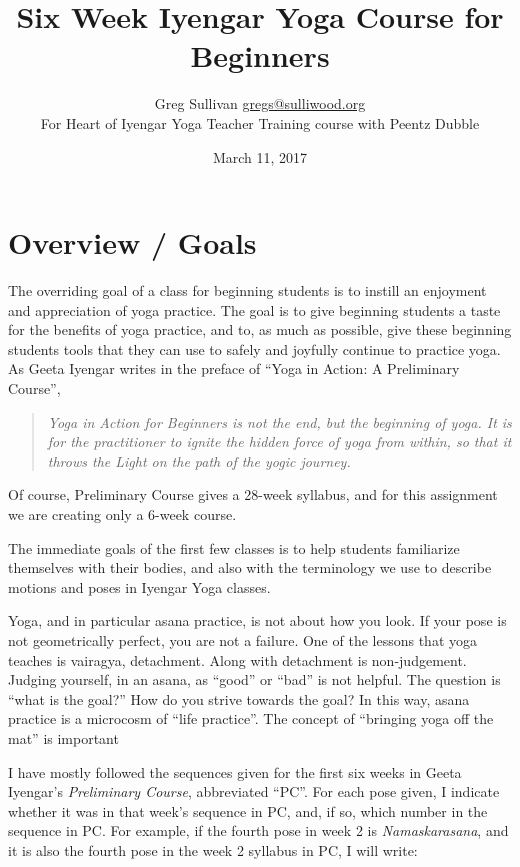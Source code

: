 \documentclass{book}
\title{Six Week Iyengar Yoga Course for Beginners}
\author{Greg Sullivan \href{mailto:gregs@sulliwood.org}{gregs@sulliwood.org} \\
For Heart of Iyengar Yoga Teacher Training course with Peentz Dubble
}
\date{March 11, 2017}
\newcommand{\pose}[1]{\emph{#1}}
\newcommand{\nam}{\pose{Namaskarasana}}
\newcounter{week}
\begin{document}
\maketitle

\tableofcontents

\chapter*{Overview / Goals}
\label{chap:overview}


The overriding goal of a class for beginning students is to instill an
enjoyment and appreciation of yoga practice. The goal is to give
beginning students a taste for the benefits of yoga practice, and to,
as much as possible, give these beginning students tools that they can
use to safely and joyfully continue to practice yoga. As Geeta Iyengar
writes in the preface of ``Yoga in Action: A Preliminary
Course''\cite{GeetaPC}, 

\begin{quote}
  \emph{Yoga in Action for Beginners is not the end, but the beginning of
  yoga. It is for the practitioner to ignite the hidden force of yoga
  from within, so that it throws the Light on the path of the yogic
  journey.}
\end{quote}

Of course, Preliminary Course gives a 28-week syllabus, and for this
assignment we are creating only a 6-week course.

The immediate goals of the first few classes is to help students
familiarize themselves with their bodies, and also with the
terminology we use to describe motions and poses in Iyengar Yoga
classes.

Yoga, and in particular asana practice, is not about how you look. If
your pose is not geometrically perfect, you are not a failure. One of
the lessons that yoga teaches is vairagya, detachment. Along with
detachment is non-judgement. Judging yourself, in an asana, as ``good''
or ``bad'' is not helpful. The question is ``what is the goal?'' How do
you strive towards the goal? In this way, asana practice is a
microcosm of ``life practice''. The concept of ``bringing yoga off the
mat'' is important


I have mostly followed the sequences given for the first six weeks in
Geeta Iyengar's \emph{Preliminary Course}\cite{GeetaPC}, abbreviated
``PC''. For each pose given, I indicate whether it was in that week's
sequence in PC, and, if so, which number in the sequence in PC.
For example, if the fourth pose in week 2 is \nam{}, and it is also
the fourth pose in the week 2 syllabus in PC, I will write:
\end{document}

